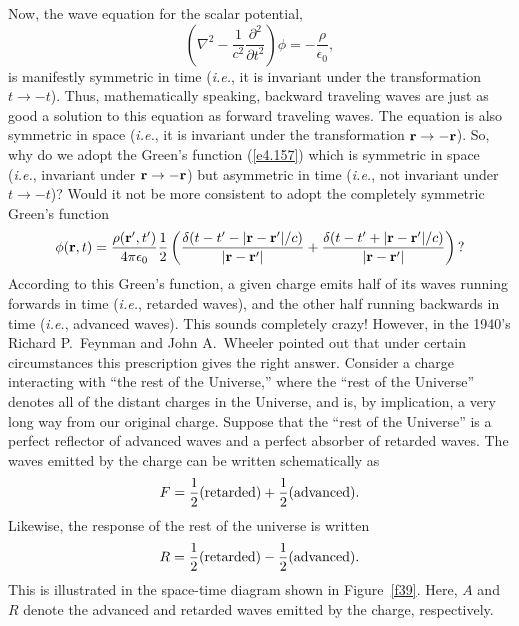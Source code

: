 Now, the wave equation
for the scalar potential,
\begin{equation}
\left( \nabla^2 - \frac{1}{c^2} \frac{\partial^2 }{\partial t^2}\right) \phi = -\frac{\rho}
{\epsilon_0},
\end{equation}
is manifestly symmetric in time ({\em i.e.}, it is invariant under the transformation
$t\rightarrow -t$). Thus, mathematically speaking, backward traveling waves are just as good a solution to this
equation as forward traveling waves. The equation is also symmetric in space ({\em i.e.}, it
is invariant under the transformation ${\bf r} \rightarrow -{\bf r}$). So, why do we adopt the Green's
function (\ref{e4.157}) which is symmetric in space ({\em i.e.},  invariant under ${\bf r}\rightarrow -{\bf r}$)
but asymmetric in time ({\em i.e.},  not invariant under $t\rightarrow -t$)? Would it not
be more consistent to adopt the  completely symmetric Green's function
\begin{equation}
\phi({\bf r}, t) = \frac{\rho({\bf r}' ,t ')} {4\pi\epsilon_0}\frac{1}{2}\left(
 \frac{\delta(
t -t' - |{\bf r} - {\bf r}'|/c)}{|{\bf r} - {\bf r}'|}+ \frac{\delta(
t -t' + |{\bf r} - {\bf r}'|/c)}{|{\bf r} - {\bf r}'|}\right)\,?
\end{equation}
According to this Green's function, a given charge emits half of its waves running forwards in time ({\em i.e.},
retarded waves), and the other half running backwards in time ({\em i.e.}, advanced waves).
This sounds completely crazy! However, in the 1940's Richard P.\ Feynman and John A.\ Wheeler 
pointed out that under certain circumstances this prescription gives the right answer. Consider
a charge interacting with ``the rest of the Universe,'' where the ``rest of the Universe'' 
denotes  all of the distant charges in the Universe, and is, by implication, a
very  long way 
from our original charge. Suppose that the ``rest of the Universe'' is a perfect reflector of
advanced waves and a perfect absorber of retarded waves. The waves emitted by the charge can
be written schematically as
\begin{equation}
F = \frac{1}{2} ({\rm retarded}) + \frac{1}{2} ({\rm advanced}).
\end{equation}
Likewise, the response of the rest of the universe is written
\begin{equation}\label{e4.126}
R =  \frac{1}{2} ({\rm retarded}) - \frac{1}{2} ({\rm advanced}).
\end{equation}
This is illustrated in the space-time diagram shown in Figure~\ref{f39}.
Here, $A$ and $R$  denote the advanced and retarded waves emitted by the charge, respectively. 
